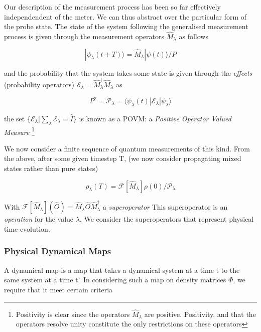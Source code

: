 Our description of the measurement process has been so far effectively independendent of the meter.
We can thus abstract over the particular form of the probe state.
The state of the system following the generalised measurement process is given through the measurement operators $\hat{M}_\lambda$ as follows

\begin{equation}
 | \psi_\lambda (t + T) \rangle = \hat{M}_\lambda | \psi(t) \rangle /P
\end{equation}

 and the probability that the system takes some state is given through the \emph{effects} (probability operators) $ \mathscr{E}_\lambda = \hat{M}_\lambda^\dagger \hat{M}_\lambda $ as

\begin{equation}
     P^2 = \mathscr{P}_\lambda = \langle \psi_\lambda (t) | \mathscr{E}_\lambda | \psi_\lambda \rangle
\end{equation}

 the set $\{\mathscr{E}_\lambda | \sum_\lambda \mathscr{E}_\lambda = \hat{I} \} $ is known as a POVM: a \emph{Positive Operator Valued Measure} \footnote{Positivity is clear since the operators $\hat{M}_\lambda$ are positive.
Positivity, and that the operators resolve unity constitute the only restrictions on these operators}

We now consider a finite sequence of quantum measurements of this kind.
From the above, after some given timestep T, (we now consider propagating mixed states rather than pure states)

\begin{equation}
     \rho_\lambda (T) = \mathscr{F}[\hat{M}_\lambda] \rho(0) / \mathscr{P}_\lambda
\end{equation}

With $\mathscr{F}[\hat{M}_\lambda] ( \hat{O} ) =  \hat{M}_\lambda \hat{O} \hat{M}_\lambda ^ \dagger$ a \emph{superoperator}
This superoperator is an \emph{operation} for the value $\lambda$.
We consider the superoperators that represent physical time evolution.

\subsubsection{Physical Dynamical Maps}
A dynamical map is a map that takes a dynamical system at a time t to the same system at a time t'.
In considering such a map on density matrices $\Phi$, we require that it meet certain criteria

